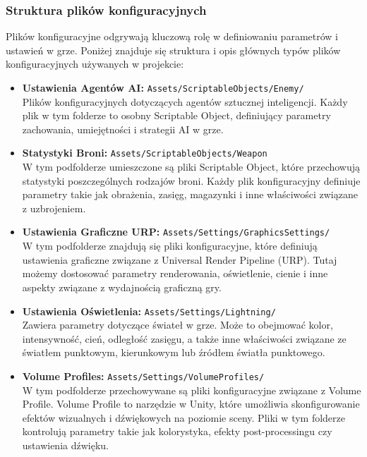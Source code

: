 \subsubsection{Struktura plików konfiguracyjnych}
Plików konfiguracyjne odgrywają kluczową rolę w definiowaniu parametrów i ustawień w grze. Poniżej znajduje się struktura i opis głównych typów plików konfiguracyjnych używanych w projekcie:
\begin{itemize}
\item \textbf{Ustawienia Agentów AI:} \texttt{Assets/ScriptableObjects/Enemy/} \\
  Plików konfiguracyjnych dotyczących agentów sztucznej inteligencji. Każdy plik w tym folderze to osobny Scriptable Object, definiujący parametry zachowania, umiejętności i strategii AI w grze.
\item \textbf{Statystyki Broni:} \texttt{Assets/ScriptableObjects/Weapon} \\
  W tym podfolderze umieszczone są pliki Scriptable Object, które przechowują statystyki poszczególnych rodzajów broni. Każdy plik konfiguracyjny definiuje parametry takie jak obrażenia, zasięg, magazynki i inne właściwości związane z uzbrojeniem.
  \item \textbf{Ustawienia Graficzne URP:} \texttt{Assets/Settings/GraphicsSettings/} \\
  W tym podfolderze znajdują się pliki konfiguracyjne, które definiują ustawienia graficzne związane z Universal Render Pipeline (URP). Tutaj możemy dostosować parametry renderowania, oświetlenie, cienie i inne aspekty związane z wydajnością graficzną gry.
  \item \textbf{Ustawienia Oświetlenia:} \texttt{Assets/Settings/Lightning/} \\
  Zawiera parametry dotyczące świateł w grze. Może to obejmować kolor, intensywność, cień, odległość zasięgu, a także inne właściwości związane ze światłem punktowym, kierunkowym lub źródłem światła punktowego.
  \item \textbf{Volume Profiles:} \texttt{Assets/Settings/VolumeProfiles/} \\
  W tym podfolderze przechowywane są pliki konfiguracyjne związane z Volume Profile. Volume Profile to narzędzie w Unity, które umożliwia skonfigurowanie efektów wizualnych i dźwiękowych na poziomie sceny. Pliki w tym folderze kontrolują parametry takie jak kolorystyka, efekty post-processingu czy ustawienia dźwięku.
\end{itemize}

